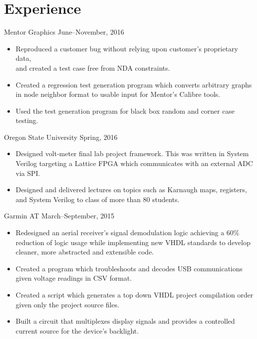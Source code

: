 \documentclass[]{friggeri-cv}
\begin{document}
\section{Experience}
\vspace{-2mm}

         {Mentor Graphics}
         {June--November, 2016}
         \begin{itemize}
           \item Reproduced a customer bug without relying upon customer's proprietary data, \\ and created a test case free from NDA constraints.
           \item Created a regression test generation program which converts arbitrary 
                 graphs in node neighbor format to usable input for Mentor's Calibre tools.
           \item Used the test generation program for black box random and corner case testing.
        \end{itemize}

         {Oregon State University}
         {Spring, 2016}
         \begin{itemize}
           \item Designed volt-meter final lab project framework. This was written in 
                 System Verilog targeting a Lattice FPGA which communicates with an 
                 external ADC via SPI.
           \item Designed and delivered lectures on topics such as Karnaugh maps, registers,
                 and System Verilog to class of more than 80 students.
         \end{itemize}

         {Garmin AT}
         {March--September, 2015}
         \begin{itemize}
           \item Redesigned an aerial receiver's signal demodulation logic achieving a 
                 $60\%$ reduction of logic usage while implementing new VHDL 
                 standards to develop cleaner, more abstracted and extensible code.
           \item Created a program  which troubleshoots and decodes USB communications given 
                 voltage readings in CSV format.
           \item Created a script which generates a top down VHDL project compilation order 
                 given only the project source files.
           \item Built a circuit that multiplexes display signals and provides
                 a controlled current source for the device's backlight.
         \end{itemize}
\end{document}
